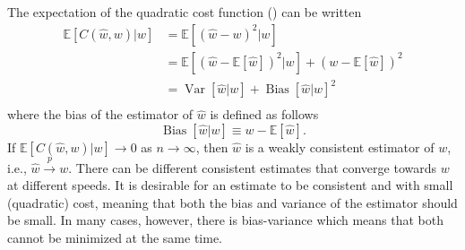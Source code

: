 \begin{theorem}
	\label{theorem:MSE}
	The expectation of the quadratic cost function () can be written
	\begin{equation}
		\begin{split}
			\mathbb{E}[C(\hat{w}, w)|w] &= \mathbb{E}[(\hat{w}-w)^2|w]\\ 
			&= \mathbb{E}[(\hat{w}-\mathbb{E}[\hat{w}])^2|w]+(w-\mathbb{E}[\hat{w}])^2\\
			&=\operatorname{Var}[\hat{w}|w]+\operatorname{Bias}[\hat{w}|w]^2\\
		\end{split}
		\label{eq:MSE}
	\end{equation}
	where the bias of the estimator of $\hat{w}$ is defined as follows
	\begin{equation}
		\operatorname{Bias}[\hat{w}|w]\equiv w-\mathbb{E}[\hat{w}].
	\end{equation}
	If $\mathbb{E}[C(\hat{w}, w)|w] \to 0$ as $n \to \infty$, then $\hat{w}$ is a weakly consistent estimator of $w$, i.e., $\hat{w} \xrightarrow{p} w$. There can be different consistent estimates that converge towards $w$ at different speeds. It is desirable for an estimate to be consistent and with small (quadratic) cost, meaning that both the bias and variance of the estimator should be small. In many cases, however, there is bias-variance which means that both cannot be minimized at the same time. 
\end{theorem}

